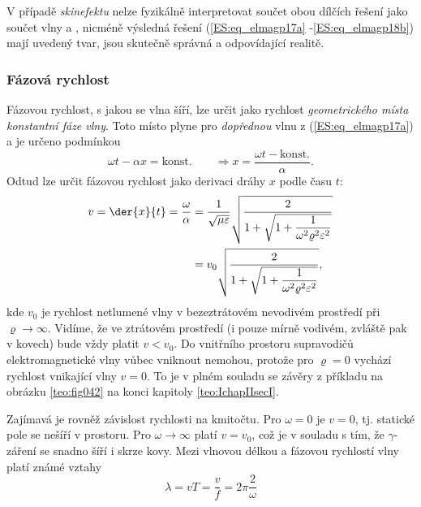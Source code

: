         V případě \emph{skinefektu} nelze fyzikálně interpretovat součet obou dílčích řešení jako 
        součet vlny  a , nicméně výsledná řešení (\ref{ES:eq_elmagp17a} 
        -\ref{ES:eq_elmagp18b}) mají uvedený tvar, jsou skutečně správná a odpovídající realitě.

      \subsubsection{Fázová rychlost}
        Fázovou rychlost, s jakou se vlna šíří, lze určit jako rychlost \emph{geometrického místa 
        konstantní fáze vlny}. Toto místo plyne pro \emph{dopřednou} vlnu z (\ref{ES:eq_elmagp17a}) 
        a je určeno podmínkou
        \begin{equation}\label{ES:eq_elmagp19}
          \omega t-\alpha x = \text{konst.}\qquad\Rightarrow
                          x = \frac{\omega t - \text{konst.}}{\alpha}.
        \end{equation}
        Odtud lze určit fázovou rychlost jako derivaci dráhy \(x\) podle času \(t\):
        \begin{align}\label{ES:eq_elmagp20}
          v  = \der{x}{t} = \frac{\omega}{\alpha}
            &= \frac{1}{\sqrt{\mu\varepsilon}}
               \sqrt{\dfrac{2}{1+\sqrt{1+\dfrac{1}{\omega^2\varrho^2\varepsilon^2}}}} \nonumber \\
            &= v_0\sqrt{\dfrac{2}{1+\sqrt{1+\dfrac{1}{\omega^2\varrho^2\varepsilon^2}}}},
        \end{align}
        kde \(v_0\) je rychlost netlumené vlny v bezeztrátovém nevodivém prostředí při \(\varrho 
        \rightarrow\infty\). Vidíme, že ve ztrátovém prostředí (i pouze mírně vodivém, zvláště 
        pak v kovech) bude vždy platit \(v < v_0\). Do vnitřního prostoru supravodičů 
        elektromagnetické vlny vůbec vniknout nemohou, protože pro \(\varrho = 0\) vychází rychlost 
        vnikající vlny \(v = 0\). To je v plném souladu se závěry z příkladu na obrázku 
        \ref{teo:fig042} na konci kapitoly \ref{teo:IchapIIsecI}.
        
        Zajímavá je rovněž závislost rychlosti na kmitočtu. Pro \(\omega = 0\) je \(v = 0\), tj. 
        statické pole se nešíří v prostoru. Pro \(\omega\rightarrow\infty\) platí \(v = v_0\), 
        což je v souladu s tím, že \(\gamma\)-záření se snadno šíří i skrze kovy. Mezi vlnovou 
        délkou a fázovou rychlostí vlny platí známé vztahy
        \begin{equation}\label{ES:eq_elmagp21}
          \lambda = vT = \frac{v}{f} = 2\pi\frac{2}{\omega}
        \end{equation}

